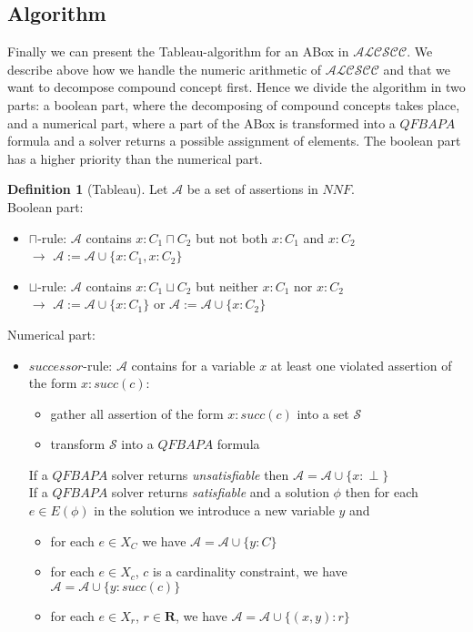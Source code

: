 \documentclass[a4paper,11pt]{scrartcl}
\theoremstyle{break}
\theoremstyle{definition}
\newtheorem{mydef}{Definition}
\begin{document}
\subsection{Algorithm}
Finally we can present the Tableau-algorithm for an ABox in $\mathcal{ALCSCC}$. We describe above how we handle the numeric arithmetic of $\mathcal{ALCSCC}$ and that we want to decompose compound concept first. Hence we divide the algorithm in two parts: a boolean part, where the decomposing of compound concepts takes place, and a numerical part, where a part of the ABox is transformed into a $QFBAPA$ formula and a solver returns a possible assignment of elements. The boolean part has a higher priority than the numerical part.
\begin{mydef}[Tableau]
Let $\mathcal{A}$ be a set of assertions in $NNF$.\\
Boolean part:
\begin{itemize}
\item\label{cap} $\sqcap$-rule: $\mathcal{A}$ contains $x:C_1\sqcap C_2$ but not both $x:C_1$ and $x:C_2$\\
$\rightarrow$ $\mathcal{A}:=\mathcal{A}\cup\{x:C_1, x:C_2\}$
\item\label{cup} $\sqcup$-rule: $\mathcal{A}$ contains $x:C_1\sqcup C_2$ but neither $x:C_1$ nor $x:C_2$\\
$\rightarrow$ $\mathcal{A}:=\mathcal{A}\cup\{x:C_1\}$ or $\mathcal{A}:=\mathcal{A}\cup\{x:C_2\}$
\end{itemize}
Numerical part:
\begin{itemize}
\item\label{succ} $successor$-rule: $\mathcal{A}$ contains for a variable $x$ at least one violated assertion of the form $x:succ(c)$:
\begin{itemize}
\item gather all assertion of the form $x:succ(c)$ into a set $\mathcal{S}$
\item transform $\mathcal{S}$ into a $QFBAPA$ formula
\end{itemize}
If a $QFBAPA$ solver returns \textit{unsatisfiable} then $\mathcal{A}=\mathcal{A}\cup\{x:\perp\}$\\
If a $QFBAPA$ solver returns \textit{satisfiable} and a solution $\phi$ then for each $e\in E(\phi)$ in the solution we introduce a new variable $y$ and
\begin{itemize}
\item for each $e\in X_C$ we have $\mathcal{A}=\mathcal{A}\cup\{y:C\}$
\item for each $e\in X_{c}$, $c$ is a cardinality constraint, we have $\mathcal{A}=\mathcal{A}\cup\{y:succ(c)\}$
\item for each $e\in X_r$, $r\in\mathbf{R}$, we have $\mathcal{A}=\mathcal{A}\cup\{(x,y):r\}$
\end{itemize}

\end{itemize}
\end{mydef}
\end{document}
